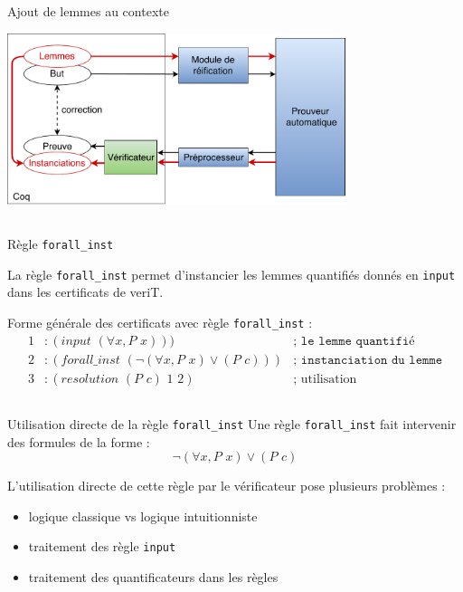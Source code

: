 \documentclass{beamer}
\begin{document}
\subsection{}
\begin{frame}{Ajout de lemmes au contexte}
\begin{center}
\includegraphics[height=5cm]{3_Contrib_Stage.pdf}
\end{center}
\end{frame}



\subsection{}
\begin{frame}{Règle \texttt{forall\_inst}}

La règle \texttt{forall\_inst} permet d'instancier les lemmes quantifiés donnés en \texttt{input} dans les certificats de veriT.

\vspace{1cm}

Forme générale des certificats avec règle \texttt{forall\_inst} : 
\begin{align*}
1&:(input \,\,(\forall x, P \,\, x))) &\texttt{; le lemme quantifié} \\
2&:(forall\_inst \,\,(\neg (\forall x, P \,\, x) \vee (P \, \, c) )) &\texttt{; instanciation du lemme} \\
3&:(resolution  \,\, (P \,\,c) \,\,1 \,\,2) & \text{; utilisation}
\end{align*}
    
\end{frame}

\subsection{}
\begin{frame}{Utilisation directe de la règle \texttt{forall\_inst}}
Une règle \texttt{forall\_inst} fait intervenir des formules de la forme :
\[  \neg (\forall x, P \,\, x) \vee (P \, \, c)  \]

L'utilisation directe de cette règle par le vérificateur pose plusieurs problèmes :

\begin{itemize}
\item logique classique vs logique intuitionniste
\item traitement des règle \texttt{input}
\item traitement des quantificateurs dans les règles
\end{itemize}
\end{frame}
\end{document}
